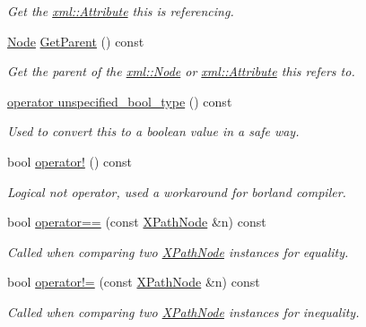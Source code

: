 \begin{DoxyCompactItemize}
\begin{DoxyCompactList}\small\item\em Get the \hyperlink{classphys_1_1xml_1_1Attribute}{xml::Attribute} this is referencing. \item\end{DoxyCompactList}\item 
\hyperlink{classphys_1_1xml_1_1Node}{Node} \hyperlink{classphys_1_1xml_1_1XPathNode_a10d6dce64d14cf3d39bb952efd4ca8aa}{GetParent} () const 
\begin{DoxyCompactList}\small\item\em Get the parent of the \hyperlink{classphys_1_1xml_1_1Node}{xml::Node} or \hyperlink{classphys_1_1xml_1_1Attribute}{xml::Attribute} this refers to. \item\end{DoxyCompactList}\item 
\hyperlink{classphys_1_1xml_1_1XPathNode_a7787db180e64bdc5f18772cc2ef5ce5c}{operator unspecified\_\-bool\_\-type} () const 
\begin{DoxyCompactList}\small\item\em Used to convert this to a boolean value in a safe way. \item\end{DoxyCompactList}\item 
bool \hyperlink{classphys_1_1xml_1_1XPathNode_a3c596b9cacb6265df6acffb91b9a7484}{operator!} () const 
\begin{DoxyCompactList}\small\item\em Logical not operator, used a workaround for borland compiler. \item\end{DoxyCompactList}\item 
bool \hyperlink{classphys_1_1xml_1_1XPathNode_ab13702ded8707602871596e4f34e8302}{operator==} (const \hyperlink{classphys_1_1xml_1_1XPathNode}{XPathNode} \&n) const 
\begin{DoxyCompactList}\small\item\em Called when comparing two \hyperlink{classphys_1_1xml_1_1XPathNode}{XPathNode} instances for equality. \item\end{DoxyCompactList}\item 
bool \hyperlink{classphys_1_1xml_1_1XPathNode_a121ba0e04b6619f45c5392374f2dc98d}{operator!=} (const \hyperlink{classphys_1_1xml_1_1XPathNode}{XPathNode} \&n) const 
\begin{DoxyCompactList}\small\item\em Called when comparing two \hyperlink{classphys_1_1xml_1_1XPathNode}{XPathNode} instances for inequality. \item\end{DoxyCompactList}\end{DoxyCompactItemize}


